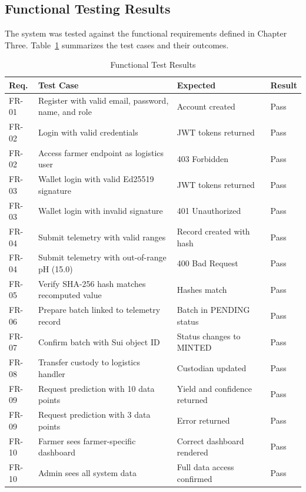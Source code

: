 \subsection{Functional Testing Results}

The system was tested against the functional requirements defined in Chapter Three. Table~\ref{tab:test_results} summarizes the test cases and their outcomes.

\begin{table}[H]
\centering
\caption{Functional Test Results}
\label{tab:test_results}
\begin{tabularx}{\textwidth}{|l|X|l|l|}
\hline
\textbf{Req.} & \textbf{Test Case} & \textbf{Expected} & \textbf{Result} \\
\hline
FR-01 & Register with valid email, password, name, and role & Account created & Pass \\
\hline
FR-02 & Login with valid credentials & JWT tokens returned & Pass \\
\hline
FR-02 & Access farmer endpoint as logistics user & 403 Forbidden & Pass \\
\hline
FR-03 & Wallet login with valid Ed25519 signature & JWT tokens returned & Pass \\
\hline
FR-03 & Wallet login with invalid signature & 401 Unauthorized & Pass \\
\hline
FR-04 & Submit telemetry with valid ranges & Record created with hash & Pass \\
\hline
FR-04 & Submit telemetry with out-of-range pH (15.0) & 400 Bad Request & Pass \\
\hline
FR-05 & Verify SHA-256 hash matches recomputed value & Hashes match & Pass \\
\hline
FR-06 & Prepare batch linked to telemetry record & Batch in PENDING status & Pass \\
\hline
FR-07 & Confirm batch with Sui object ID & Status changes to MINTED & Pass \\
\hline
FR-08 & Transfer custody to logistics handler & Custodian updated & Pass \\
\hline
FR-09 & Request prediction with 10 data points & Yield and confidence returned & Pass \\
\hline
FR-09 & Request prediction with 3 data points & Error returned & Pass \\
\hline
FR-10 & Farmer sees farmer-specific dashboard & Correct dashboard rendered & Pass \\
\hline
FR-10 & Admin sees all system data & Full data access confirmed & Pass \\
\hline
\end{tabularx}
\end{table}

